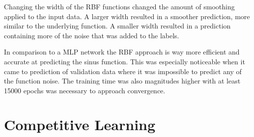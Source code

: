 \documentclass{article}
\begin{document}
Changing the width of the RBF functions changed the amount of smoothing applied to the input data. A larger width resulted in a smoother prediction, more similar to the underlying function. A smaller width resulted in a prediction containing more of the noise that was added to the labels.

In comparison to a MLP network the RBF approach is way more efficient and accurate at predicting the sinus function. This was especially noticeable when it came to prediction of validation data where it was impossible to predict any of the function noise. The training time was also magnitudes higher with at least 15000 epochs was necessary to approach convergence.

\section{Competitive Learning}
\end{document}
